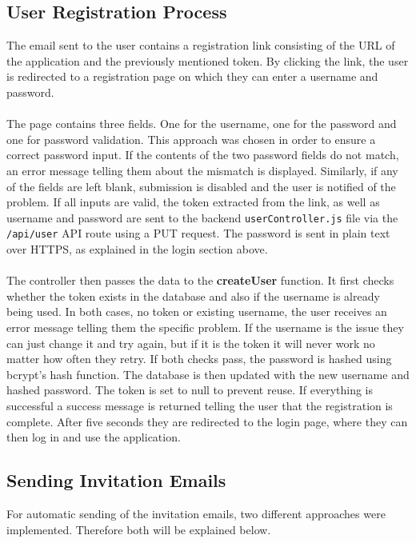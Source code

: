 \documentclass[a4paper,12pt]{report}
\begin{document}
\subsection{User Registration Process}
The email sent to the user contains a registration link consisting of the URL of the application and the previously mentioned token. By clicking the link, the user is redirected to a registration page on which they can enter a username and password. \\\\
The page contains three fields. One for the username, one for the password and one for password validation. This approach was chosen in order to ensure a correct password input. If the contents of the two password fields do not match, an error message telling them about the mismatch is displayed. Similarly, if any of the fields are left blank, submission is disabled and the user is notified of the problem. If all inputs are valid, the token extracted from the link, as well as username and password are sent to the backend \texttt{userController.js} file via the \texttt{/api/user} API route using a PUT request. The password is sent in plain text over HTTPS, as explained in the login section above. \\\\
The controller then passes the data to the \textbf{createUser} function. It first checks whether the token exists in the database and also if the username is already being used. In both cases, no token or existing username, the user receives an error message telling them the specific problem. If the username is the issue they can just change it and try again, but if it is the token it will never work no matter how often they retry. If both checks pass, the password is hashed using bcrypt's hash function. The database is then updated with the new username and hashed password. The token is set to null to prevent reuse. If everything is successful a success message is returned telling the user that the registration is complete. After five seconds they are redirected to the login page, where they can then log in and use the application. \\
\subsection{Sending Invitation Emails}
For automatic sending of the invitation emails, two different approaches were implemented. Therefore both will be explained below.
\end{document}
